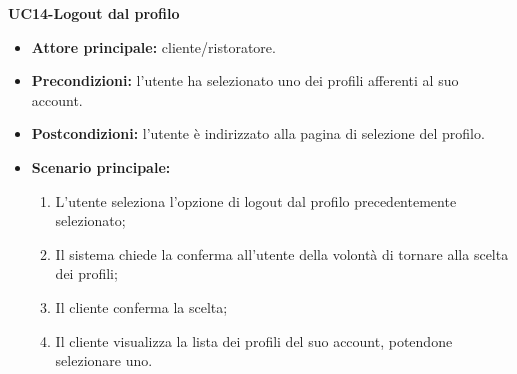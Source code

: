 \textbf{UC14-Logout dal profilo}
\begin{itemize}
\item \textbf{Attore principale:} cliente/ristoratore.
\item \textbf{Precondizioni:} l'utente ha selezionato uno dei profili afferenti al suo account.
\item \textbf{Postcondizioni:} l'utente è indirizzato alla pagina di selezione del profilo.
\item \textbf{Scenario principale:}
\begin{enumerate}
    \item L'utente seleziona l'opzione di logout dal profilo precedentemente selezionato;
    \item Il sistema chiede la conferma all'utente della volontà di tornare alla scelta dei profili;
    \item Il cliente conferma la scelta;
    \item Il cliente visualizza la lista dei profili del suo account, potendone selezionare uno.
\end{enumerate}
\end{itemize}
